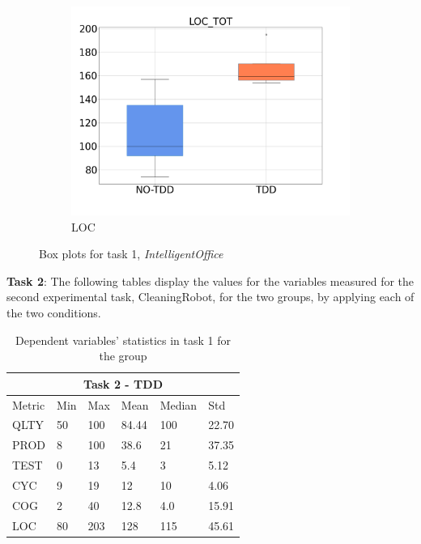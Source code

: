 \begin{figure}[H]
\begin{subfigure}{0.33\textwidth}
        \includegraphics[width=\linewidth]{figures/box_plots/task1/LOC.png}
        \caption{LOC}
        \label{bp_task1_loc}
    \end{subfigure}
    \caption{Box plots for task 1, \textit{IntelligentOffice}}
    \label{box_plots_task1}
\end{figure}





\noindent \textbf{Task 2}: The following tables display the values for the variables measured for the second experimental task, CleaningRobot, for the two groups, by applying each of the two conditions.
\begin{table}[!h]
    \begin{center} 
        \begin{tabular}{ |p{2cm}||p{1.6cm}|p{1.6cm}|p{1.6cm}|p{1.6cm}|p{1.6cm}|}
            \hline
                \multicolumn{6}{|c|}{Task 2 - TDD} \\
            \hline
                Metric & Min & Max & Mean & Median & Std\\
            \hline
                QLTY & 50 & 100 & 84.44 & 100 & 22.70 \\
                PROD & 8 & 100 & 38.6 & 21 & 37.35 \\
                TEST & 0 & 13 & 5.4 & 3 & 5.12 \\
                CYC & 9 & 19 & 12 & 10 & 4.06 \\
                COG & 2 & 40 & 12.8 & 4.0 & 15.91 \\
                LOC & 80 & 203 & 128 & 115 & 45.61 \\
            \hline
        \end{tabular}
        \caption{\label{tab_dv_t2_tdd}Dependent variables' statistics in task 1 for the \tdd group}
    \end{center}
\end{table}

